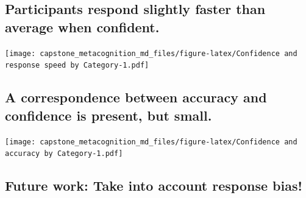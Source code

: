 \documentclass[]{article}
\begin{document}
\hypertarget{participants-respond-slightly-faster-than-average-when-confident.}{%
\subsection{Participants respond slightly faster than average when
confident.}\label{participants-respond-slightly-faster-than-average-when-confident.}}

\texttt{[image: capstone\_metacognition\_md\_files/figure-latex/Confidence and response speed by Category-1.pdf]}

\hypertarget{a-correspondence-between-accuracy-and-confidence-is-present-but-small.}{%
\subsection{A correspondence between accuracy and confidence is present,
but
small.}\label{a-correspondence-between-accuracy-and-confidence-is-present-but-small.}}

\texttt{[image: capstone\_metacognition\_md\_files/figure-latex/Confidence and accuracy by Category-1.pdf]}

\hypertarget{future-work-take-into-account-response-bias}{%
\subsection{Future work: Take into account response
bias!}\label{future-work-take-into-account-response-bias}}
\end{document}
